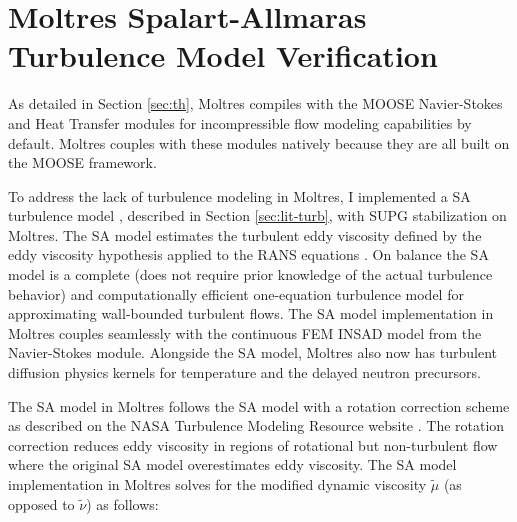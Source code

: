 \section{Moltres Spalart-Allmaras Turbulence Model Verification} \label{sec:turbulence}

As detailed in Section \ref{sec:th}, Moltres compiles with the MOOSE Navier-Stokes
\cite{peterson_overview_2018} and Heat Transfer modules for incompressible flow
modeling capabilities by default. Moltres couples with these modules natively because they are all
built on the MOOSE framework.

To address the lack of turbulence modeling in Moltres, I implemented a \gls{SA} turbulence model
\cite{spalart_one-equation_1994}, described in Section \ref{sec:lit-turb}, with \gls{SUPG}
stabilization on Moltres. The \gls{SA} model estimates the turbulent eddy viscosity defined by the
eddy viscosity hypothesis applied to the \gls{RANS} equations \cite{rodi_turbulence_2017}.
On balance the \gls{SA} model is a complete (does not require prior
knowledge of the actual turbulence behavior) and computationally efficient one-equation turbulence
model for approximating wall-bounded turbulent flows. The \gls{SA} model implementation in Moltres
couples seamlessly with the continuous \gls{FEM} \gls{INSAD}
\cite{peterson_overview_2018, lindsay_automatic_2021} model
from the Navier-Stokes module. Alongside the \gls{SA} model, Moltres also now has turbulent
diffusion physics kernels for temperature and the delayed neutron precursors.

The SA model in Moltres follows the \gls{SA} model with a rotation correction scheme
\cite{aupoix_extensions_2003, dacles-mariani_numericalexperimental_1995} as described on the
\gls{NASA} Turbulence Modeling Resource website \cite{rumsey_turbulence_nodate}. The rotation
correction reduces eddy viscosity in regions of rotational but non-turbulent flow where the
original \gls{SA} model overestimates eddy viscosity. The \gls{SA} model implementation in Moltres
solves for the modified dynamic viscosity $\tilde{\mu}$ (as opposed to $\tilde{\nu}$) as follows:

